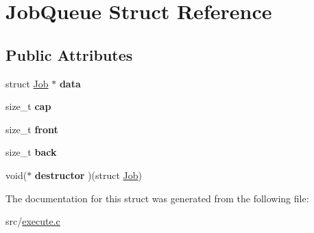 \hypertarget{structJobQueue}{}\section{Job\+Queue Struct Reference}
\label{structJobQueue}
\subsection*{Public Attributes}
\begin{DoxyCompactItemize}
\item 
struct \hyperlink{structJob}{Job} $\ast$ {\bfseries data}\hypertarget{structJobQueue_a262352e9440b1e6fc802439f58c5ac71}{}\label{structJobQueue_a262352e9440b1e6fc802439f58c5ac71}

\item 
size\+\_\+t {\bfseries cap}\hypertarget{structJobQueue_a3ac977a93e12958a06784b199615199f}{}\label{structJobQueue_a3ac977a93e12958a06784b199615199f}

\item 
size\+\_\+t {\bfseries front}\hypertarget{structJobQueue_a6514558b6c7b07c23b7aa65dbfac4b9d}{}\label{structJobQueue_a6514558b6c7b07c23b7aa65dbfac4b9d}

\item 
size\+\_\+t {\bfseries back}\hypertarget{structJobQueue_a23f4cd0d5b406b48cf42253cb848d85c}{}\label{structJobQueue_a23f4cd0d5b406b48cf42253cb848d85c}

\item 
void($\ast$ {\bfseries destructor} )(struct \hyperlink{structJob}{Job})\hypertarget{structJobQueue_a7cc5611027c086ed7cb9dd6060e0ce32}{}\label{structJobQueue_a7cc5611027c086ed7cb9dd6060e0ce32}

\end{DoxyCompactItemize}


The documentation for this struct was generated from the following file\+:\begin{DoxyCompactItemize}
\item 
src/\hyperlink{execute_8c}{execute.\+c}\end{DoxyCompactItemize}
